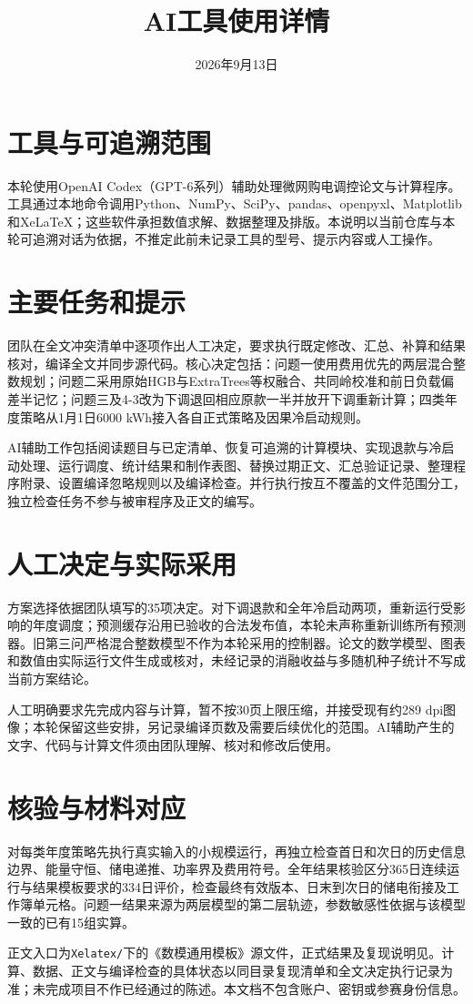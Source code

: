 \documentclass[UTF8,fontset=none,a4paper,11pt]{ctexart}
\title{AI工具使用详情}
\author{}\date{2026年9月13日}
\begin{document}
\maketitle
\section*{工具与可追溯范围}
本轮使用OpenAI Codex（GPT-6系列）辅助处理微网购电调控论文与计算程序。工具通过本地命令调用Python、NumPy、SciPy、pandas、openpyxl、Matplotlib和XeLaTeX；这些软件承担数值求解、数据整理及排版。本说明以当前仓库与本轮可追溯对话为依据，不推定此前未记录工具的型号、提示内容或人工操作。
\section*{主要任务和提示}
团队在全文冲突清单中逐项作出人工决定，要求执行既定修改、汇总、补算和结果核对，编译全文并同步源代码。核心决定包括：问题一使用费用优先的两层混合整数规划；问题二采用原始HGB与ExtraTrees等权融合、共同岭校准和前日负载偏差半记忆；问题三及4-3改为下调退回相应原款一半并放开下调重新计算；四类年度策略从1月1日6000 kWh接入各自正式策略及因果冷启动规则。

AI辅助工作包括阅读题目与已定清单、恢复可追溯的计算模块、实现退款与冷启动处理、运行调度、统计结果和制作表图、替换过期正文、汇总验证记录、整理程序附录、设置编译忽略规则以及编译检查。并行执行按互不覆盖的文件范围分工，独立检查任务不参与被审程序及正文的编写。
\section*{人工决定与实际采用}
方案选择依据团队填写的35项决定。对下调退款和全年冷启动两项，重新运行受影响的年度调度；预测缓存沿用已验收的合法发布值，本轮未声称重新训练所有预测器。旧第三问严格混合整数模型不作为本轮采用的控制器。论文的数学模型、图表和数值由实际运行文件生成或核对，未经记录的消融收益与多随机种子统计不写成当前方案结论。

人工明确要求先完成内容与计算，暂不按30页上限压缩，并接受现有约289 dpi图像；本轮保留这些安排，另记录编译页数及需要后续优化的范围。AI辅助产生的文字、代码与计算文件须由团队理解、核对和修改后使用。
\section*{核验与材料对应}
对每类年度策略先执行真实输入的小规模运行，再独立检查首日和次日的历史信息边界、能量守恒、储电递推、功率界及费用符号。全年结果核验区分365日连续运行与结果模板要求的334日评价，检查最终有效版本、日末到次日的储电衔接及工作簿单元格。问题一结果来源为两层模型的第二层轨迹，参数敏感性依据与该模型一致的已有15组实算。

正文入口为\texttt{Xelatex/}下的《数模通用模板》源文件，正式结果及复现说明见。计算、数据、正文与编译检查的具体状态以同目录复现清单和全文决定执行记录为准；未完成项目不作已经通过的陈述。本文档不包含账户、密钥或参赛身份信息。
\end{document}

